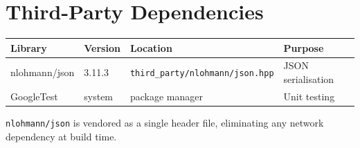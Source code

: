\documentclass[12pt, a4paper]{article}
\begin{document}
\section{Third-Party Dependencies}

\begin{center}
\begin{tabular}{llll}
\toprule
\textbf{Library} & \textbf{Version} & \textbf{Location} & \textbf{Purpose} \\
\midrule
nlohmann/json & 3.11.3 & \texttt{third\_party/nlohmann/json.hpp} & JSON serialisation \\
GoogleTest    & system & package manager & Unit testing \\
\bottomrule
\end{tabular}
\end{center}

\texttt{nlohmann/json} is vendored as a single header file, eliminating any
network dependency at build time.
\end{document}
